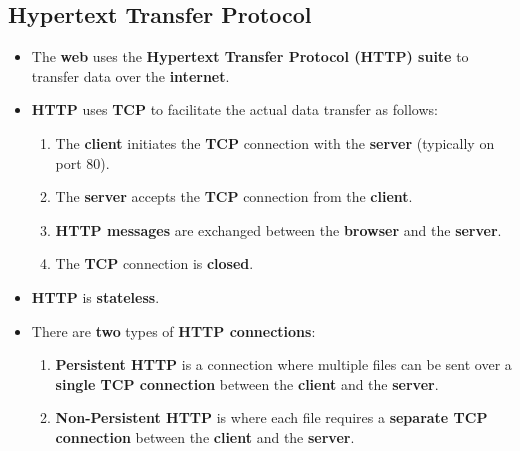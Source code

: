 \documentclass[16pt]{article}
\begin{document}
    \subsection*{Hypertext Transfer Protocol}
    \begin{itemize}
        \item The \textbf{web} uses the \textbf{Hypertext Transfer Protocol (HTTP) suite} to transfer data over the \textbf{internet}.
            \item \textbf{HTTP} uses \textbf{TCP} to facilitate the actual data transfer as follows:
            \begin{enumerate}
                \item The \textbf{client} initiates the \textbf{TCP} connection with the \textbf{server} (typically on port 80).
                \item The \textbf{server} accepts the \textbf{TCP} connection from the \textbf{client}.
                \item \textbf{HTTP messages} are exchanged between the \textbf{browser} and the \textbf{server}.
                \item The \textbf{TCP} connection is \textbf{closed}.
            \end{enumerate}
        \item \textbf{HTTP} is \textbf{stateless}.
        \item There are \textbf{two} types of \textbf{HTTP connections}:
        \begin{enumerate}
            \item \textbf{Persistent HTTP} is a connection where multiple files can be sent over a \textbf{single TCP connection} between the \textbf{client} and the \textbf{server}.
            \item \textbf{Non-Persistent HTTP} is where each file requires a \textbf{separate TCP connection} between the \textbf{client} and the \textbf{server}. 
        \end{enumerate}

    \end{itemize}
\end{document}
